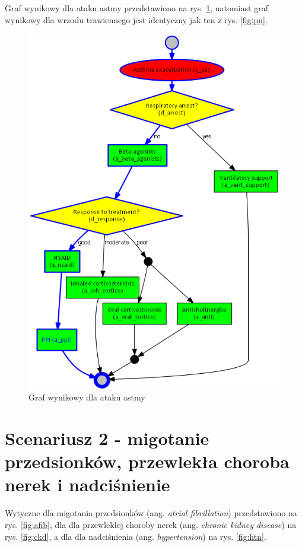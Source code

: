 Graf wynikowy dla ataku astmy przedstawiono na rys. \ref{fig:rozw_ae}, natomiast graf wynikowy dla wrzodu trawiennego jest identyczny jak ten z rys. \ref{fig:pu}.
\begin{figure}[H]
\centering
\includegraphics[scale=0.45]{img/rozwiazanie1asthma.png}
\caption{Graf wynikowy dla ataku astmy}
\label{fig:rozw_ae}
\end{figure}
\newpage
\section{Scenariusz 2 - migotanie przedsionków, przewlekła choroba nerek i nadciśnienie}
Wytyczne dla migotania przedsionków (ang. \textit{atrial fibrillation}) przedstawiono na rys. \ref{fig:afib}, dla dla przewlekłej choroby nerek (ang. \textit{chronic kidney disease}) na rys. \ref{fig:ckd}, a dla dla nadciśnienia (ang. \textit{hypertension}) na rys. \ref{fig:htn}.

